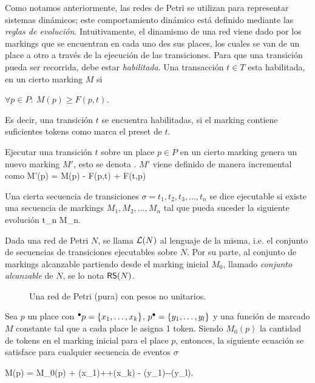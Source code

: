 Como notamos anteriormente, las redes de Petri se utilizan para representar sistemas 
dinámicos; este comportamiento dinámico está definido mediante las \emph{reglas de evolución}.
Intuitivamente, el dinamismo de una red viene dado por los markings que se encuentran en cada
uno des sus places, los cuales se van  de un place a otro a través de la 
ejecución de las transiciones. 
Para que una transición pueda ser recorrida, debe estar \emph{habilitada}. Una transacción 
$t \in T$ esta habilitada, en un cierto marking $M$ si 

\bequation
    \mbox{$\forall p \in P:~ M(p) \ge F(p,t) $}.
\eequation

Es decir, una transición $t$ se encuentra habilitadas, si el marking contiene suficientes
tokens como marca el preset de $t$.

Ejecutar una transición $t$ sobre un place $p \in P$ en un cierto marking genera 
un nuevo marking $M'$, esto se denota .
$M'$ viene definido de manera incremental como
\bequation
    M'(p) = M(p) - F(p,t) +  F(t,p)
\eequation

Una cierta secuencia de transiciones \mbox{$\sigma = t_1,t_2, t_3, \ldots, t_n$}
se dice ejecutable si existe una secuencia de markings \mbox{$M_1, M_2, \ldots, M_n$}
tal que pueda suceder la siguiente evolución
\bequation
     {t_n} {M_n}.
\eequation

Dada una red de Petri $N$, se llama $\mathcal{L}(N)$ al lenguaje de la misma, i.e.
el conjunto de secuencias de transiciones ejecutables sobre $N$.
Por su parte, al conjunto de markings alcanzable partiendo desde el marking inicial $M_0$,
llamado \emph{conjunto alcanzable} de $N$, se lo nota $\textsf{RS}(N)$.

\begin{figure}[t]
  	\centering
    
    \caption{Una red de Petri (pura) con pesos no unitarios.}
    \label{fig:pn1}
\end{figure}

Sea $p$ un place con \mbox{$\mbox{$^\bullet p$}=\{x_1,\ldots,x_k\}$}, \mbox{$\mbox{$p^\bullet$}=\{y_1,\ldots,y_l\}$} 
y una función de marcado $M$ constante  tal que a cada place le asigna 1 token.
Siendo $M_0(p)$ la cantidad de tokens en el marking inicial 
para el place $p$, entonces, la siguiente ecuación
se satisface para cualquier secuencia de eventos $\sigma$

    M(p) = M_0(p) + \widehat\sigma(x_1)+\cdots +\widehat\sigma(x_k) - \widehat\sigma(y_1)-\cdots -\widehat\sigma(y_l).
\eequation

